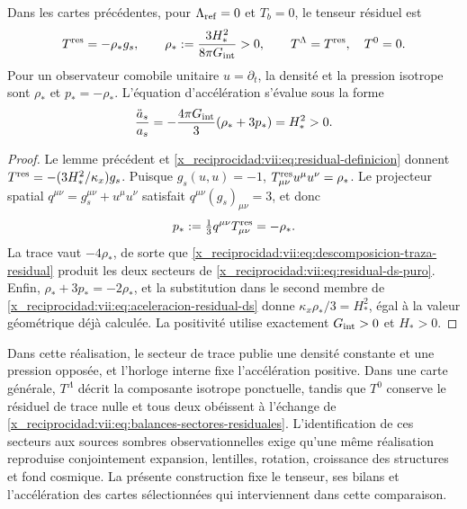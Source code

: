 \begin{theorem}
\label{x_reciprocidad:vii:thm:residual-ds-aceleracion}
Dans les cartes précédentes, pour \(\Lambda_{\rm ref}=0\) et \(T_b=0\), le tenseur résiduel est
\begin{equation}
 T^{\rm res}=-\rho_*g_s,\qquad
 \rho_*:=\frac{3H_*^2}{8\pi G_{\rm int}}>0,
 \qquad T^\Lambda=T^{\rm res},\quad T^0=0.
 \label{x_reciprocidad:vii:eq:residual-ds-puro}
\end{equation}
Pour un observateur comobile unitaire \(u=\partial_t\), la densité
et la pression isotrope sont \(\rho_*\) et \(p_*=-\rho_*\).
L'équation d'accélération s'évalue sous la forme
\begin{equation}
 \frac{\ddot a_s}{a_s}
 =-\frac{4\pi G_{\rm int}}3(\rho_*+3p_*)=H_*^2>0.
 \label{x_reciprocidad:vii:eq:aceleracion-residual-ds}
\end{equation}
\end{theorem}
\begin{proof}
Le lemme précédent et \eqref{x_reciprocidad:vii:eq:residual-definicion} donnent \(T^{\rm res}=-(3H_*^2/\kappa_x)g_s\). Puisque \(g_s(u,u)=-1\), \(T^{\rm res}_{\mu\nu}u^\mu u^\nu=\rho_*\). Le projecteur spatial \(q^{\mu\nu}=g_s^{\mu\nu}+u^\mu u^\nu\) satisfait \(q^{\mu\nu}(g_s)_{\mu\nu}=3\), et donc
\[
 p_*:=\tfrac13q^{\mu\nu}T^{\rm res}_{\mu\nu}=-\rho_*.
\]
La trace vaut \(-4\rho_*\), de sorte que
\eqref{x_reciprocidad:vii:eq:descomposicion-traza-residual} produit les deux secteurs
de \eqref{x_reciprocidad:vii:eq:residual-ds-puro}. Enfin,
\(\rho_*+3p_*=-2\rho_*\), et la substitution dans le second membre
de \eqref{x_reciprocidad:vii:eq:aceleracion-residual-ds} donne
\(\kappa_x\rho_*/3=H_*^2\), égal à la valeur géométrique déjà calculée.
La positivité utilise exactement \(G_{\rm int}>0\) et \(H_*>0\).
\end{proof}

Dans cette réalisation, le secteur de trace publie une densité constante et une pression opposée, et l'horloge interne fixe l'accélération positive. Dans une carte générale, \(T^\Lambda\) décrit la composante isotrope ponctuelle, tandis que \(T^0\) conserve le résiduel de trace nulle et tous deux obéissent à l'échange de \eqref{x_reciprocidad:vii:eq:balances-sectores-residuales}. L'identification de ces secteurs aux sources sombres observationnelles exige qu'une même réalisation reproduise conjointement expansion, lentilles, rotation, croissance des structures et fond cosmique. La présente construction fixe le tenseur, ses bilans et l'accélération des cartes sélectionnées qui interviennent dans cette comparaison.

